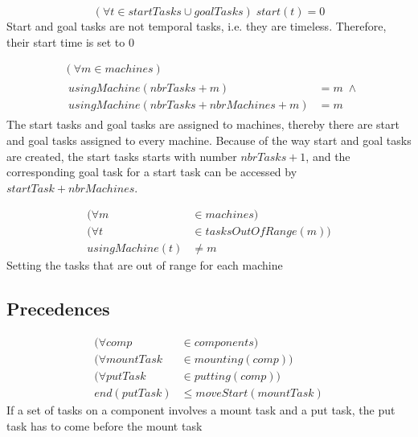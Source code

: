  \begin{equation}\label{eq:93}
 (\forall t \in startTasks \cup goalTasks) \; start(t) = 0
 \end{equation}
 Start and goal tasks are not temporal tasks, i.e. they are timeless. Therefore, their start time is set to 0
 
 
 \begin{equation}
 \begin{aligned}\label{eq:94}
 &(\forall m \in machines) \\
 &\begin{aligned}
 usingMachine(nbrTasks + m) &= m \; \land\\
 usingMachine(nbrTasks + nbrMachines + m) &= m
 \end{aligned}
 \end{aligned}
 \end{equation}
 The start tasks and goal tasks are assigned to machines, thereby there are start and goal tasks assigned to every machine. Because of the way start and goal tasks are created, the start tasks starts with number $nbrTasks + 1$, and the corresponding goal task for a start task can be accessed by $startTask + nbrMachines$.
 
 \begin{equation}\label{eq:95}
 \begin{aligned}
 (\forall m &\in machines) \\
 (\forall t &\in tasksOutOfRange(m)) \\
 usingMachine(t) &\neq m
 \end{aligned}
 \end{equation}
 Setting the tasks that are out of range for each machine
 
 \subsection{Precedences}
 
 \begin{equation}
 \begin{aligned}\label{eq:96}
 (\forall comp &\in components) \\
 (\forall mountTask &\in mounting(comp)) \\
 (\forall putTask &\in putting(comp)) \\
 end(putTask) &\le moveStart(mountTask)
 \end{aligned}
 \end{equation}
 If a set of tasks on a component involves a mount task and a put task, the put task has to come before the mount task
 
